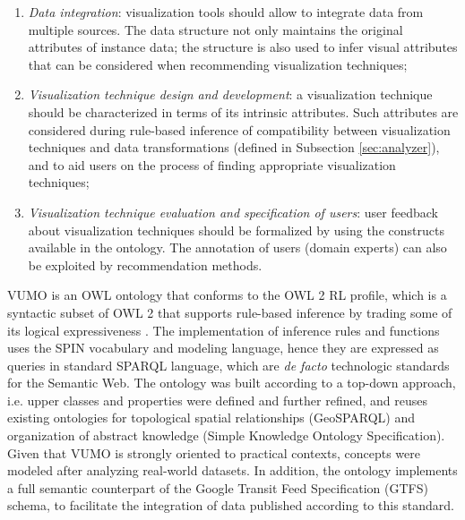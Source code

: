 \documentclass[]{interact}
\theoremstyle{plain}%
\theoremstyle{definition}
\theoremstyle{remark}
\theoremstyle{definition}
\begin{document}
\begin{enumerate}
	\item \emph{Data integration}: visualization tools should allow to integrate data from multiple sources. The data structure not only maintains the original attributes of instance data; the structure is also used to infer visual attributes that can be considered when recommending visualization techniques;
	\item \emph{Visualization technique design and development}: a visualization technique should be characterized in terms of its intrinsic attributes. Such attributes are considered during rule-based inference of compatibility between visualization techniques and data transformations (defined in Subsection \ref{sec:analyzer}), and to aid users on the process of finding appropriate visualization techniques;
	\item \emph{Visualization technique evaluation and specification of users}: user feedback about visualization techniques should be formalized by using the constructs available in the ontology. The annotation of users (domain experts) can also be exploited by recommendation methods.
\end{enumerate}


VUMO is an OWL ontology that conforms to the OWL 2 RL profile, which is a syntactic subset of OWL 2 that supports rule-based inference by trading some of its logical expressiveness \citep{owl}. The implementation of inference rules and functions uses the SPIN vocabulary and modeling language, hence they are expressed as queries in standard SPARQL language, which are \emph{de facto} technologic standards for the Semantic Web. The ontology was built according to a top-down approach, i.e. upper classes and properties were defined and further refined, and reuses existing ontologies for topological spatial relationships (GeoSPARQL) and organization of abstract knowledge (Simple Knowledge Ontology Specification). Given that VUMO is strongly oriented to practical contexts, concepts were modeled after analyzing real-world datasets. In addition, the ontology implements a full semantic counterpart of the Google Transit Feed Specification (GTFS) schema, to facilitate the integration of data published according to this standard.
\end{document}
